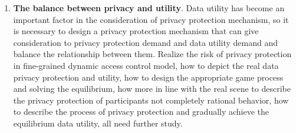 \documentclass[pdftex,notypeinfo,twoside,openany,UTF8,fntef]{CASthesis}
\theoremstyle{THrm}{
	\newtheorem{question}{Question}[section]
	\newtheorem{property}{性质}[section]
	\newtheorem{assumption}{假设}[section]
	\newtheorem{claim}[lemma]{断言}
	
}
\begin{document}
\begin {enumerate}
\item \textbf{The balance between privacy and utility}. Data utility has become an important factor in the consideration of privacy protection mechanism, so it is necessary to design a privacy protection mechanism that can give consideration to privacy protection demand and data utility demand and balance the relationship between them. Realize the risk of privacy protection in fine-grained dynamic access control model, how to depict the real data privacy protection and utility, how to design the appropriate game process and solving the equilibrium, how more in line with the real scene to describe the privacy protection of participants not completely rational behavior, how to describe the process of privacy protection and gradually achieve the equilibrium data utility, all need further study.
\end{enumerate}
\end{document}
